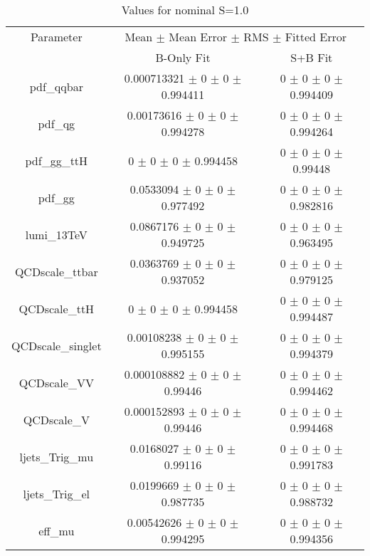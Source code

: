 \begin{table}
\centering
\caption{Values for nominal S=1.0}
\begin{tabular}{ccc}
\toprule
Parameter 	& \multicolumn{2}{c}{Mean $\pm$ Mean Error $\pm$ RMS $\pm$ Fitted Error}\\
 	& B-Only Fit & S+B Fit\\
\midrule
pdf\_qqbar 	& \num{0.000713321} $\pm$ \num{0} $\pm$ \num{0} $\pm$ \num{0.994411} 	& \num{0} $\pm$ \num{0} $\pm$ \num{0} $\pm$ \num{0.994409}\\
pdf\_qg 	& \num{0.00173616} $\pm$ \num{0} $\pm$ \num{0} $\pm$ \num{0.994278} 	& \num{0} $\pm$ \num{0} $\pm$ \num{0} $\pm$ \num{0.994264}\\
pdf\_gg\_ttH 	& \num{0} $\pm$ \num{0} $\pm$ \num{0} $\pm$ \num{0.994458} 	& \num{0} $\pm$ \num{0} $\pm$ \num{0} $\pm$ \num{0.99448}\\
pdf\_gg 	& \num{0.0533094} $\pm$ \num{0} $\pm$ \num{0} $\pm$ \num{0.977492} 	& \num{0} $\pm$ \num{0} $\pm$ \num{0} $\pm$ \num{0.982816}\\
lumi\_13TeV 	& \num{0.0867176} $\pm$ \num{0} $\pm$ \num{0} $\pm$ \num{0.949725} 	& \num{0} $\pm$ \num{0} $\pm$ \num{0} $\pm$ \num{0.963495}\\
QCDscale\_ttbar 	& \num{0.0363769} $\pm$ \num{0} $\pm$ \num{0} $\pm$ \num{0.937052} 	& \num{0} $\pm$ \num{0} $\pm$ \num{0} $\pm$ \num{0.979125}\\
QCDscale\_ttH 	& \num{0} $\pm$ \num{0} $\pm$ \num{0} $\pm$ \num{0.994458} 	& \num{0} $\pm$ \num{0} $\pm$ \num{0} $\pm$ \num{0.994487}\\
QCDscale\_singlet 	& \num{0.00108238} $\pm$ \num{0} $\pm$ \num{0} $\pm$ \num{0.995155} 	& \num{0} $\pm$ \num{0} $\pm$ \num{0} $\pm$ \num{0.994379}\\
QCDscale\_VV 	& \num{0.000108882} $\pm$ \num{0} $\pm$ \num{0} $\pm$ \num{0.99446} 	& \num{0} $\pm$ \num{0} $\pm$ \num{0} $\pm$ \num{0.994462}\\
QCDscale\_V 	& \num{0.000152893} $\pm$ \num{0} $\pm$ \num{0} $\pm$ \num{0.99446} 	& \num{0} $\pm$ \num{0} $\pm$ \num{0} $\pm$ \num{0.994468}\\
ljets\_Trig\_mu 	& \num{0.0168027} $\pm$ \num{0} $\pm$ \num{0} $\pm$ \num{0.99116} 	& \num{0} $\pm$ \num{0} $\pm$ \num{0} $\pm$ \num{0.991783}\\
ljets\_Trig\_el 	& \num{0.0199669} $\pm$ \num{0} $\pm$ \num{0} $\pm$ \num{0.987735} 	& \num{0} $\pm$ \num{0} $\pm$ \num{0} $\pm$ \num{0.988732}\\
eff\_mu 	& \num{0.00542626} $\pm$ \num{0} $\pm$ \num{0} $\pm$ \num{0.994295} 	& \num{0} $\pm$ \num{0} $\pm$ \num{0} $\pm$ \num{0.994356}\\

\end{tabular}
\end{table}
